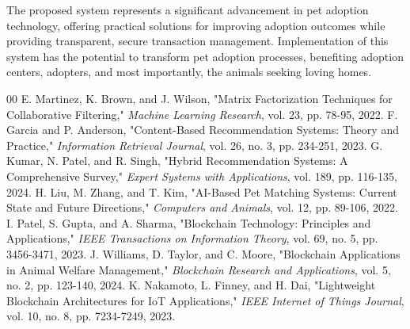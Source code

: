 \documentclass[conference]{IEEEtran}
\begin{document}
The proposed system represents a significant advancement in pet adoption technology, offering practical solutions for improving adoption outcomes while providing transparent, secure transaction management. Implementation of this system has the potential to transform pet adoption processes, benefiting adoption centers, adopters, and most importantly, the animals seeking loving homes.

\begin{thebibliography}{00}
 E. Martinez, K. Brown, and J. Wilson, "Matrix Factorization Techniques for Collaborative Filtering," \textit{Machine Learning Research}, vol. 23, pp. 78-95, 2022.
 F. Garcia and P. Anderson, "Content-Based Recommendation Systems: Theory and Practice," \textit{Information Retrieval Journal}, vol. 26, no. 3, pp. 234-251, 2023.
 G. Kumar, N. Patel, and R. Singh, "Hybrid Recommendation Systems: A Comprehensive Survey," \textit{Expert Systems with Applications}, vol. 189, pp. 116-135, 2024.
 H. Liu, M. Zhang, and T. Kim, "AI-Based Pet Matching Systems: Current State and Future Directions," \textit{Computers and Animals}, vol. 12, pp. 89-106, 2022.
 I. Patel, S. Gupta, and A. Sharma, "Blockchain Technology: Principles and Applications," \textit{IEEE Transactions on Information Theory}, vol. 69, no. 5, pp. 3456-3471, 2023.
 J. Williams, D. Taylor, and C. Moore, "Blockchain Applications in Animal Welfare Management," \textit{Blockchain Research and Applications}, vol. 5, no. 2, pp. 123-140, 2024.
 K. Nakamoto, L. Finney, and H. Dai, "Lightweight Blockchain Architectures for IoT Applications," \textit{IEEE Internet of Things Journal}, vol. 10, no. 8, pp. 7234-7249, 2023.
\end{thebibliography}
\end{document}
